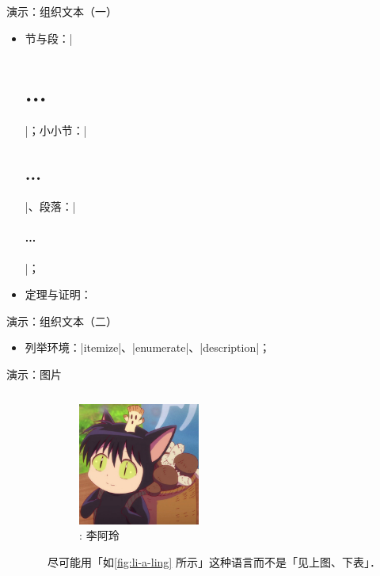 \begin{frame}[fragile]{演示：组织文本（一）}
	\begin{itemize}
		\item<+-> 节与段：|\section{...}|；小小节：|\subsection{...}|、段落：|\paragraph{...}|；
		\item<+-> 定理与证明：\onslide<+->
			
	\end{itemize}
\end{frame}

\begin{frame}[fragile]{演示：组织文本（二）}
	\begin{itemize}
		\item 列举环境：|itemize|、|enumerate|、|description|；\onslide<+->
		      
	\end{itemize}
\end{frame}

\begin{frame}[t,fragile]{演示：图片}
	\begin{columns}
		\begin{column}{.58\textwidth}
			
		\end{column}
        \pause
		\begin{column}{.4\textwidth}
			\footnotesize
			\begin{figure}
				\centering
				\includegraphics[width=4cm]{images/li-a-ling.jpg}
				\caption{\figurename\thefigure: 李阿玲}
				\label{fig:li-a-ling}
			\end{figure}
			尽可能用「如\figurename\autoref{fig:li-a-ling} 所示」这种语言而不是「见上图、下表」．
		\end{column}
	\end{columns}
\end{frame}

